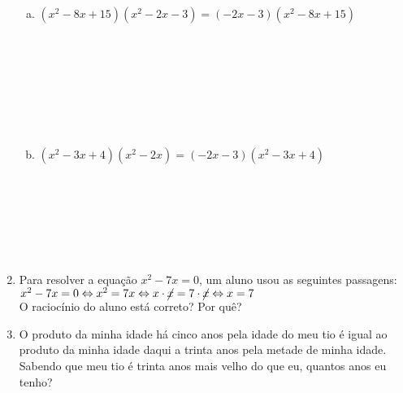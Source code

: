 \documentclass[a4paper,14pt]{article}
\begin{document}
\begin{multicols}{2}
\begin{enumerate}
\begin{enumerate}[a)]
    			\item $(x^2 - 8x + 15)(x^2 - 2x - 3) = (-2x - 3)(x^2 - 8x + 15)$ \\\\\\\\\\\\\\\\
    			\item $(x^2 - 3x + 4)(x^2 - 2x) = (-2x - 3)(x^2 - 3x + 4)$ \\\\\\\\\\\\\\
    		\end{enumerate}
    		\item Para resolver a equação $x^2 - 7x = 0$, um aluno usou as seguintes passagens: \\
    		$x^2 - 7x = 0 \Leftrightarrow x^2 = 7x \Leftrightarrow x \cdot \cancel{x} = 7 \cdot \cancel{x} \Leftrightarrow x = 7$ \\
    		O raciocínio do aluno está correto? Por quê? \newpage
    		\item O produto da minha idade há cinco anos pela idade do meu tio é igual ao produto da minha idade daqui a trinta anos pela metade de minha idade. Sabendo que meu tio é trinta anos mais velho do que eu, quantos anos eu tenho?
    	\end{enumerate}

\end{multicols}
\end{document}
